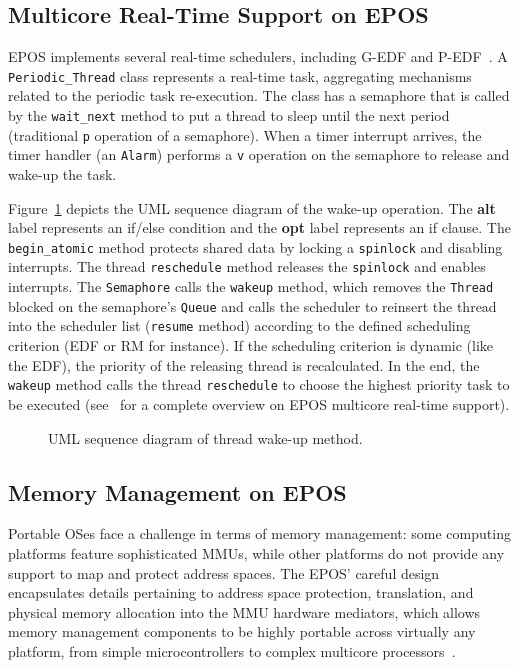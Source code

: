 \documentclass[10pt, conference, compsocconf]{IEEEtran}
\newcommand{\fig}[4][ht!]{
  \begin{figure}[#1]
    {\centering{\texttt{[image: fig/\#2]}}\par}
    \caption{#3}
    \label{fig:#2}
  \end{figure}
}
\begin{document}
\subsection{Multicore Real-Time Support on EPOS}
\label{sec:epos_real_time}

EPOS implements several real-time schedulers, including G-EDF and P-EDF~\cite{Gracioli:2013}. A \texttt{Periodic\_Thread} class represents a real-time task, aggregating mechanisms related to the periodic task re-execution. The class has a semaphore that is called by the \texttt{wait\_next} method to put a thread to sleep until the next period (traditional \texttt{p} operation of a semaphore). When a timer interrupt arrives, the timer handler (an \texttt{Alarm}) performs a \texttt{v} operation on the semaphore to release and wake-up the task. 

Figure~\ref{fig:uml_sequence_thread_wakeup} depicts the UML sequence diagram of the wake-up operation. The \textbf{alt} label represents an if/else condition and the \textbf{opt} label represents an if clause. The \texttt{begin\_atomic} method protects shared data by locking a \texttt{spinlock} and disabling interrupts. The thread \texttt{reschedule} method releases the \texttt{spinlock} and enables interrupts. The \texttt{Semaphore} calls the \texttt{wakeup} method, which removes the \texttt{Thread} blocked on the semaphore's \texttt{Queue} and calls the scheduler to reinsert the thread into the scheduler list (\texttt{resume} method) according to the defined scheduling criterion (EDF or RM for instance). If the scheduling criterion is dynamic (like the EDF), the priority of the releasing thread is recalculated. In the end, the \texttt{wakeup} method calls the thread \texttt{reschedule} to choose the highest priority task to be executed (see~\cite{Gracioli:2013} for a complete overview on EPOS multicore real-time support).

\fig{uml_sequence_thread_wakeup}{UML sequence diagram of thread wake-up method.}{scale=.45}


\subsection{Memory Management on EPOS}

Portable OSes face a challenge in terms of memory management: some computing platforms feature sophisticated MMUs, while other platforms do not provide any support to map and protect address spaces. The EPOS' careful design encapsulates details pertaining to address space protection, translation, and physical memory allocation into the MMU hardware mediators, which allows memory management components to be highly portable across virtually any platform, from simple microcontrollers to complex multicore processors~\cite{Polpeta2004}.
\end{document}
